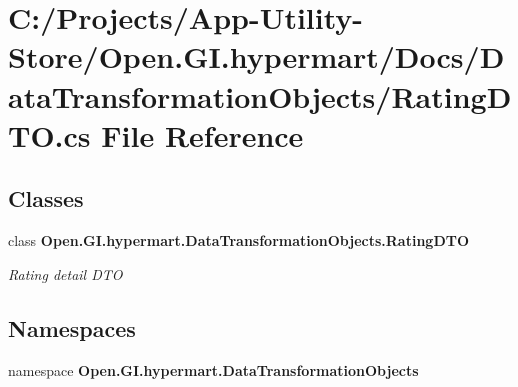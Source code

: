 \section{C\+:/\+Projects/\+App-\/\+Utility-\/\+Store/\+Open.G\+I.\+hypermart/\+Docs/\+Data\+Transformation\+Objects/\+Rating\+D\+TO.cs File Reference}
\label{_rating_d_t_o_8cs}
\subsection*{Classes}
\begin{DoxyCompactItemize}
\item 
class \textbf{ Open.\+G\+I.\+hypermart.\+Data\+Transformation\+Objects.\+Rating\+D\+TO}
\begin{DoxyCompactList}\small\item\em Rating detail D\+TO \end{DoxyCompactList}\end{DoxyCompactItemize}
\subsection*{Namespaces}
\begin{DoxyCompactItemize}
\item 
namespace \textbf{ Open.\+G\+I.\+hypermart.\+Data\+Transformation\+Objects}
\end{DoxyCompactItemize}

